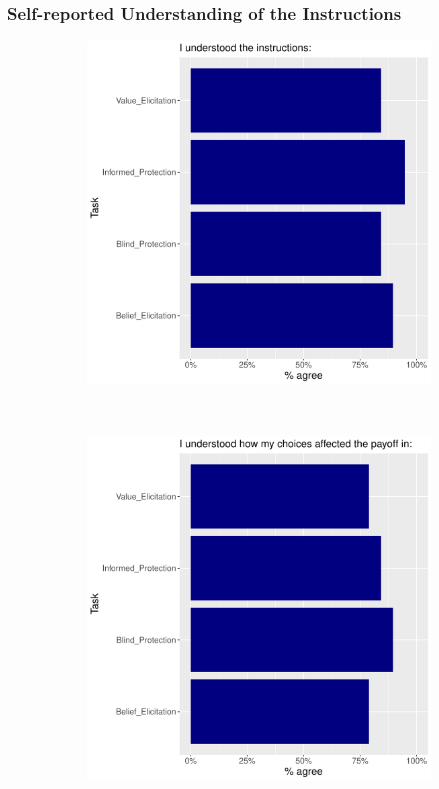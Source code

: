 \documentclass[11pt,hyperref={bookmarks=false}]{beamer}
\begin{document}
\begin{frame}
\frametitle{Self-reported Understanding of the Instructions}
\begin{figure}[h]
\begin{subfigure}{0.45\textwidth}
\includegraphics[width=\textwidth]{Graphs/Uplot1.pdf}
\end{subfigure}
~
\begin{subfigure}{0.45\textwidth}
\includegraphics[width=\textwidth]{Graphs/Uplot2.pdf}
\end{subfigure}
\end{figure}
\end{frame}
\end{document}
